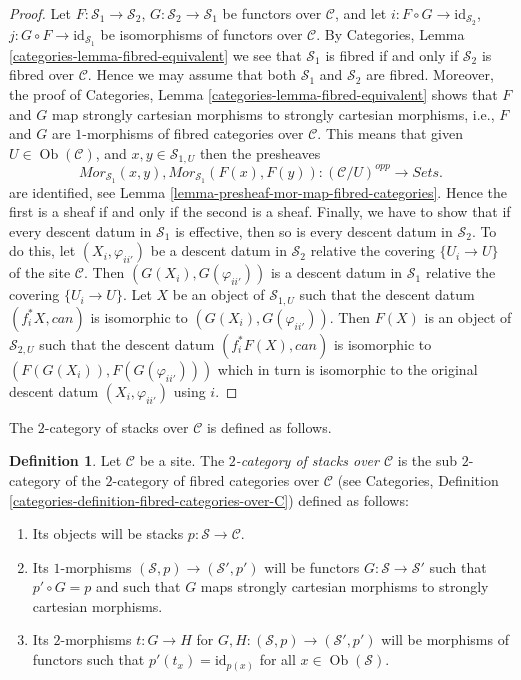 \documentclass{stacks-project}
\theoremstyle{plain}
\theoremstyle{definition}
\newtheorem{definition}[subsection]{Definition}
\theoremstyle{remark}
\numberwithin{equation}{subsection}
\def\Ob{\mathop{\mathrm{Ob}}\nolimits}
\begin{document}
\begin{proof}
Let $F : \mathcal{S}_1 \to \mathcal{S}_2$,
$G : \mathcal{S}_2 \to \mathcal{S}_1$ be functors over $\mathcal{C}$, and let
$i : F \circ G \to \text{id}_{\mathcal{S}_2}$,
$j : G \circ F \to \text{id}_{\mathcal{S}_1}$ be isomorphisms of
functors over $\mathcal{C}$. By
Categories, Lemma \ref{categories-lemma-fibred-equivalent}
we see that $\mathcal{S}_1$ is fibred if and only if $\mathcal{S}_2$
is fibred over $\mathcal{C}$. Hence we may assume that both
$\mathcal{S}_1$ and $\mathcal{S}_2$ are fibred. Moreover, the proof of
Categories, Lemma \ref{categories-lemma-fibred-equivalent}
shows that $F$ and $G$ map strongly cartesian morphisms to strongly
cartesian morphisms, i.e., $F$ and $G$ are $1$-morphisms of fibred
categories over $\mathcal{C}$. This means that given
$U \in \Ob(\mathcal{C})$, and $x, y \in \mathcal{S}_{1, U}$ then
the presheaves
$$
\mathit{Mor}_{\mathcal{S}_1}(x, y),
\mathit{Mor}_{\mathcal{S}_1}(F(x), F(y)) :
(\mathcal{C}/U)^{opp} \longrightarrow \textit{Sets}.
$$
are identified, see
Lemma \ref{lemma-presheaf-mor-map-fibred-categories}. Hence
the first is a sheaf if and only if the second is a sheaf.
Finally, we have to show that if every descent datum in $\mathcal{S}_1$
is effective, then so is every descent datum in $\mathcal{S}_2$.
To do this, let $(X_i, \varphi_{ii'})$ be a descent datum
in $\mathcal{S}_2$ relative the covering $\{U_i \to U\}$ of the site
$\mathcal{C}$. Then $(G(X_i), G(\varphi_{ii'}))$ is a descent datum
in $\mathcal{S}_1$ relative the covering $\{U_i \to U\}$.
Let $X$ be an object of $\mathcal{S}_{1, U}$ such that the
descent datum $(f_i^*X, can)$ is isomorphic to
$(G(X_i), G(\varphi_{ii'}))$. Then $F(X)$ is an object of $\mathcal{S}_{2, U}$
such that the descent datum $(f_i^*F(X), can)$ is isomorphic to
$(F(G(X_i)), F(G(\varphi_{ii'})))$ which in turn is isomorphic to
the original descent datum $(X_i, \varphi_{ii'})$ using $i$.
\end{proof}

\noindent
The $2$-category of stacks over $\mathcal{C}$
is defined as follows.

\begin{definition}
\label{definition-stacks-over-C}
Let $\mathcal{C}$ be a site.
The {\it $2$-category of stacks over $\mathcal{C}$}
is the sub $2$-category of the $2$-category of fibred categories
over $\mathcal{C}$ (see
Categories, Definition \ref{categories-definition-fibred-categories-over-C})
defined as follows:
\begin{enumerate}
\item Its objects will be stacks $p : \mathcal{S} \to \mathcal{C}$.
\item Its $1$-morphisms $(\mathcal{S}, p) \to (\mathcal{S}', p')$
will be functors $G : \mathcal{S} \to \mathcal{S}'$ such that
$p' \circ G = p$ and such that $G$ maps strongly cartesian
morphisms to strongly cartesian morphisms.
\item Its $2$-morphisms $t : G \to H$ for
$G, H : (\mathcal{S}, p) \to (\mathcal{S}', p')$
will be morphisms of functors
such that $p'(t_x) = \text{id}_{p(x)}$
for all $x \in \Ob(\mathcal{S})$.
\end{enumerate}
\end{definition}
\end{document}
